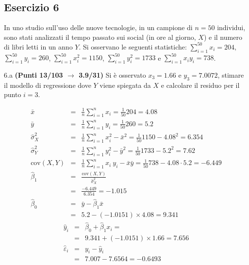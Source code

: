 \documentclass[
  11pt,
]{book}
\theoremstyle{mytheoremstyle}
\theoremstyle{mydefstyle}
\newenvironment{sol}
  {
  \begin{tcolorbox}[enhanced,breakable,arc=0.1mm,boxrule=1pt,colback=white,colframe=iblue,
  title=\bf \fontfamily{lmss}\selectfont \hspace{.5 cm} Soluzione,drop fuzzy shadow]

}{
\end{tcolorbox}
  }
\begin{document}
\subsection{Esercizio 6}\label{esercizio-6-32}

In uno studio sull'uso delle nuove tecnologie, in un campione di \(n=50\) individui, sono stati analizzati il tempo passato sui social (in ore al giorno, \(X\)) e il numero di libri letti in un anno \(Y\).
Si osservano le seguenti statistiche:
\(\sum_{i=1}^{50}x_i=204\), \(\sum_{i=1}^{50}y_i=260\),
\(\sum_{i=1}^{50}x_i^2=1150\), \(\sum_{i=1}^{50}y_i^2=1733\) e \(\sum_{i=1}^{50}x_iy_i=738\).

6.a \textbf{(Punti 13/103 \(\rightarrow\) 3.9/31)} Si è osservato \(x_3=1.66\) e \(y_3=7.0072\), stimare il modello di regressione dove \(Y\) viene spiegata da \(X\) e calcolare il residuo per il punto \(i=3\).

\begin{sol}
\begin{eqnarray*}
           \bar x &=&\frac 1 n\sum_{i=1}^n x_i = \frac {1}{ 50 }  204 =  4.08 \\
           \bar y &=&\frac 1 n\sum_{i=1}^n y_i = \frac {1}{ 50 }  260 =  5.2 \\
           \hat\sigma_X^2&=&\frac 1 n\sum_{i=1}^n x_i^2-\bar x^2=\frac {1}{ 50 }  1150  - 4.08 ^2= 6.354 \\
           \hat\sigma_Y^2&=&\frac 1 n\sum_{i=1}^n y_i^2-\bar y^2=\frac {1}{ 50 }  1733  - 5.2 ^2= 7.62 \\
           \text{cov}(X,Y)&=&\frac 1 n\sum_{i=1}^n x_i~y_i-\bar x\bar y=\frac {1}{ 50 }  738 - 4.08 \cdot 5.2 = -6.449 \\
           \hat\beta_1 &=& \frac{\text{cov}(X,Y)}{\hat\sigma_X^2} \\
                    &=& \frac{ -6.449 }{ 6.354 }  =  -1.015 \\
           \hat\beta_0 &=& \bar y - \hat\beta_1 \bar x\\
                    &=&  5.2 - (-1.0151) \times  4.08 = 9.341 
         \end{eqnarray*}\begin{eqnarray*}
\hat y_i &=&\hat\beta_0+\hat\beta_1 x_i=\\ 
&=& 9.341 + (-1.0151) \times 1.66 = 7.656 \\ 
\hat \varepsilon_i &=& y_i-\hat y_i\\ 
&=& 7.007 - 7.6564 = -0.6493  
\end{eqnarray*}

\end{sol}
\end{document}
